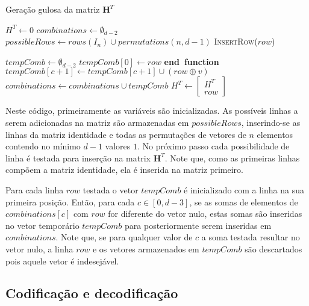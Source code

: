 \begin{algorithm}
\label{alg:geracao_matriz}
\caption{Geração gulosa da matriz $\textbf{H}^T$}
\begin{algorithmic}[1]
\State $H^T \gets 0$
\State $combinations \gets \emptyset_{d-2}$
\State $possibleRows \gets rows(I_n) \cup permutations(n, d - 1)$
    \State \textsc{InsertRow($row$)}
\EndFor

    \State $tempComb \gets \emptyset_{d-2}$
    \State $tempComb[0] \gets row$
                \State \textbf{end\ function}
            \EndIf
                \State $tempComb[c + 1] \gets tempComb[c+1] \cup (row \oplus v)$
            \EndIf
        \EndFor
    \EndFor
    \State $combinations \gets combinations \cup tempComb$
    \State $H^T \gets \begin{bmatrix} H^T \\ row \end{bmatrix}$
\EndFunction
\end{algorithmic}
\end{algorithm}

Neste código, primeiramente as variáveis são inicializadas. As possíveis linhas a serem adicionadas na matriz são armazenadas em $possibleRows$, inserindo-se as linhas da matriz identidade e todas as permutações de vetores de $n$ elementos contendo no mínimo $d - 1$ valores $1$. No próximo passo cada possibilidade de linha é testada para inserção na matrix $\textbf{H}^T$. Note que, como as primeiras linhas compõem a matriz identidade, ela é inserida na matriz primeiro. 

Para cada linha $row$ testada o vetor $tempComb$ é inicializado com a linha na sua primeira posição. Então, para cada $c \in [0, d-3]$, se as somas de elementos de $combinations[c]$ com $row$ for diferente do vetor nulo, estas somas são inseridas no vetor temporário $tempComb$ para posteriormente serem inseridas em $combinations$. Note que, se para qualquer valor de $c$ a soma testada resultar no vetor nulo, a linha $row$ e os vetores armazenados em $tempComb$ são descartados pois aquele vetor é indesejável.

\subsection{Codificação e decodificação}


